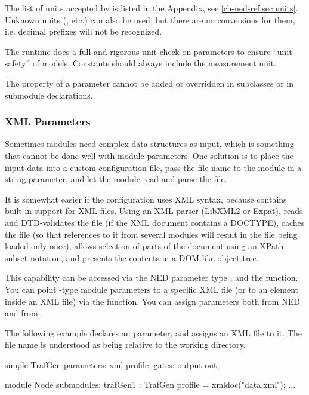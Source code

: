 \begin{note}
    The list of units accepted by {\opp} is listed in the Appendix, see
    \ref{ch-ned-ref:sec:units}. Unknown units (, etc.)
    can also be used, but there are no conversions for them,
    i.e. decimal prefixes will not be recognized.
\end{note}

The {\opp} runtime does a full and rigorous unit check on
parameters to ensure ``unit safety'' of models. Constants should
always include the measurement unit.

The  property of a parameter cannot be added or overridden
in subclasses or in submodule declarations.


\subsubsection{XML Parameters}

Sometimes modules need complex data structures as input, which is something
that cannot be done well with module parameters. One solution is to place
the input data into a custom configuration file, pass the file name to the
module in a string parameter, and let the module read and parse the file.

It is somewhat easier if the configuration uses XML syntax, because {\opp}
contains built-in support for XML files. Using an XML parser (LibXML2 or
Expat), {\opp} reads and DTD-validates the file (if the XML document
contains a DOCTYPE), caches the file (so that references to it from several
modules will result in the file being loaded only once), allows selection
of parts of the document using an XPath-subset notation, and presents the
contents in a DOM-like object tree.

This capability can be accessed via the NED parameter type ,
and the  function. You can point -type
module parameters to a specific XML file (or to an element inside an XML
file) via the  function. You can assign 
parameters both from NED and from .

The following example declares an  parameter, and assigns an
XML file to it. The file name is understood as being relative to the working
directory.

\begin{ned}
simple TrafGen {
    parameters:
        xml profile;
    gates:
        output out;
}

module Node {
    submodules:
        trafGen1 : TrafGen {
            profile = xmldoc("data.xml");
        }
        ...
}
\end{ned}

